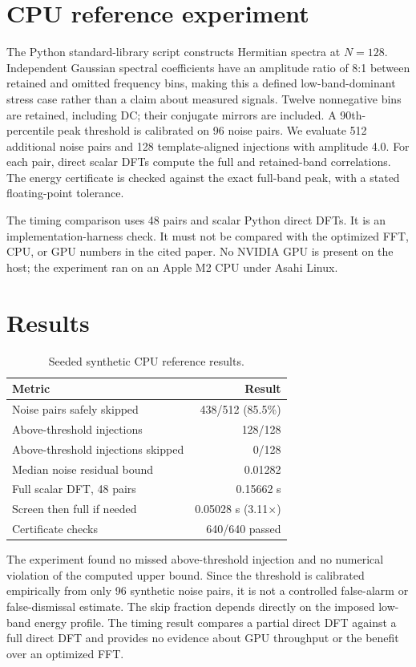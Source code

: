 \documentclass[11pt]{article}
\begin{document}
\section{CPU reference experiment}
The Python standard-library script constructs Hermitian spectra at $N=128$. Independent Gaussian spectral coefficients have an amplitude ratio of 8:1 between retained and omitted frequency bins, making this a defined low-band-dominant stress case rather than a claim about measured signals. Twelve nonnegative bins are retained, including DC; their conjugate mirrors are included. A 90th-percentile peak threshold is calibrated on 96 noise pairs. We evaluate 512 additional noise pairs and 128 template-aligned injections with amplitude 4.0. For each pair, direct scalar DFTs compute the full and retained-band correlations. The energy certificate is checked against the exact full-band peak, with a stated floating-point tolerance.

The timing comparison uses 48 pairs and scalar Python direct DFTs. It is an implementation-harness check. It must not be compared with the optimized FFT, CPU, or GPU numbers in the cited paper. No NVIDIA GPU is present on the host; the experiment ran on an Apple M2 CPU under Asahi Linux.

\section{Results}
\begin{table}[t]
\centering\small
\caption{Seeded synthetic CPU reference results.}
\begin{tabular}{lr}
\toprule
Metric & Result\\
\midrule
Noise pairs safely skipped & 438/512 (85.5\%)\\
Above-threshold injections & 128/128\\
Above-threshold injections skipped & 0/128\\
Median noise residual bound & 0.01282\\
Full scalar DFT, 48 pairs & 0.15662 s\\
Screen then full if needed & 0.05028 s (3.11$\times$)\\
Certificate checks & 640/640 passed\\
\bottomrule
\end{tabular}
\end{table}
The experiment found no missed above-threshold injection and no numerical violation of the computed upper bound. Since the threshold is calibrated empirically from only 96 synthetic noise pairs, it is not a controlled false-alarm or false-dismissal estimate. The skip fraction depends directly on the imposed low-band energy profile. The timing result compares a partial direct DFT against a full direct DFT and provides no evidence about GPU throughput or the benefit over an optimized FFT.
\end{document}
